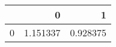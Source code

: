 \begin{tabular}{lrr}
\toprule
{} &         0 &         1 \\
\midrule
0 &  1.151337 &  0.928375 \\
\bottomrule
\end{tabular}
